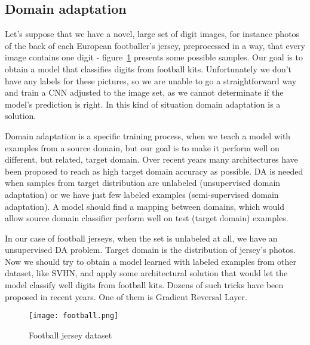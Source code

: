 \documentclass{article}
\begin{document}
\subsection{Domain adaptation}
Let's suppose that we have a novel, large set of digit images, for instance photos of the back of each European footballer's jersey, preprocessed in a way, that every image contains one digit - figure~\ref{fig:football} presents some possible samples. Our goal is to obtain a model that classifies digits from football kits. Unfortunately we don't have any labels for these pictures, so we are unable to go a straightforward way and train a CNN adjusted to the image set, as we cannot determinate if the model's prediction is right. In this kind of situation domain adaptation is a solution.
\par
Domain adaptation is a specific training process, when we teach a model with examples from a source domain, but our goal is to make it perform well on different, but related, target domain. Over recent years many architectures have been proposed to reach as high target domain accuracy as possible. DA is needed when samples from target distribution are unlabeled (unsupervised domain adaptation) or we have just few labeled examples (semi-supervised domain adaptation). A model should find a mapping between domains, which would allow source domain classifier perform well on test (target domain) examples.
\par
In our case of football jerseys, when the set is unlabeled at all, we have an unsupervised DA problem. Target domain is the distribution of jersey's photos. Now we should try to obtain a model learned with labeled examples from other dataset, like SVHN, and apply some architectural solution that would let the model classify well digits from football kits. Dozens of such tricks have been proposed in recent years. One of them is Gradient Reversal Layer.

\begin{figure}%
    \centering
    \texttt{[image: football.png]}%
    \caption{Football jersey dataset}
    \label{fig:football}%
\end{figure}
\end{document}
